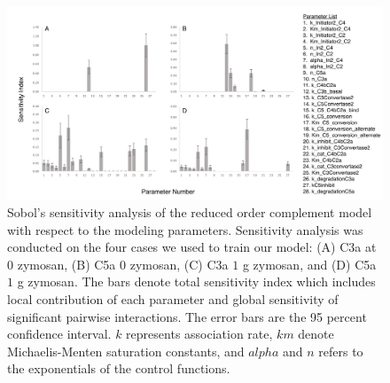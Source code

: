 \documentclass[12pt]{article}
\begin{document}
\begin{figure}[h]
\centering
\includegraphics[width=1.0\textwidth]{./Figures/Figure4_Sensitivity_Analysis_v2.pdf}
\caption{Sobol's sensitivity analysis of the reduced order complement model with respect to the modeling parameters.  Sensitivity analysis was conducted on the four cases we used to train our model: (A) C3a at $0$ zymosan, (B) C5a $0$ zymosan, (C) C3a $1$ g zymosan, and (D) C5a $1$ g zymosan. The bars denote total sensitivity index which includes local contribution of each parameter and global sensitivity of significant pairwise interactions. The error bars are the 95 percent confidence interval. $k$ represents association rate, $km$ denote Michaelis-Menten saturation constants, and $alpha$ and $n$ refers to the exponentials of the control functions.}
\label{fig-SA}
\end{figure}

\clearpage

\renewcommand\thefigure{S\arabic{figure}}
\renewcommand\thetable{T\arabic{table}}
\renewcommand\thepage{S-\arabic{page}}
\renewcommand\theequation{S\arabic{equation}}

\setcounter{equation}{0}
\setcounter{table}{0}
\setcounter{figure}{0}
\setcounter{page}{1}


\end{document}
